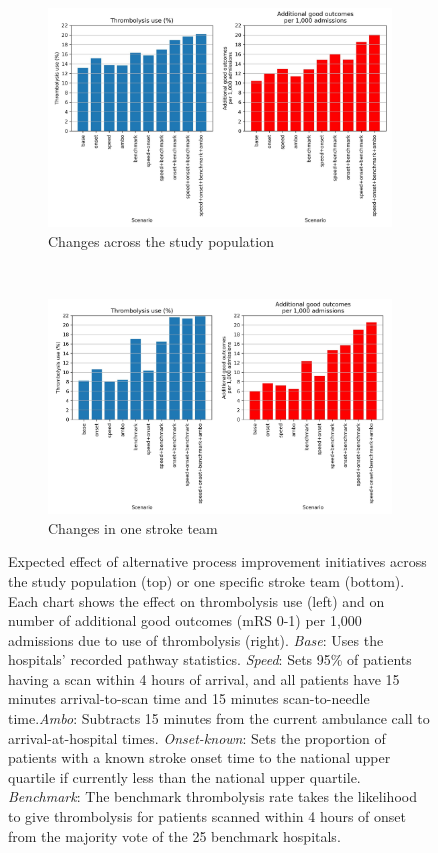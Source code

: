 \begin{figure}[!h]
    \centering
    \begin{subfigure}[b]{1\textwidth}
        \centering
        \includegraphics[width=0.8\linewidth]{images/sim_results_summary}
        \caption{Changes across the study population}
        \label{fig:scenarios_population}
    \end{subfigure}
    \\
    \vspace{8mm}
    \begin{subfigure}[b]{1\textwidth}
        \centering
    \includegraphics[width=0.8\linewidth]{images/sim_results_team_x}
        \caption{Changes in one stroke team}
        \label{fig:scenarios_team}
    \end{subfigure}
    \caption{Expected effect of alternative process improvement initiatives across the study population (top) or one specific stroke team (bottom). Each chart shows the effect on thrombolysis use (left) and on number of additional good outcomes (mRS 0-1) per 1,000 admissions due to use of thrombolysis (right). \textit{Base}: Uses the hospitals’ recorded pathway statistics. \textit{Speed}: Sets 95\% of patients having a scan within 4 hours of arrival, and all patients have 15 minutes arrival-to-scan time and 15 minutes scan-to-needle time.\textit{Ambo}: Subtracts 15 minutes from the current ambulance call to arrival-at-hospital times. \textit{Onset-known}: Sets the proportion of patients with a known stroke onset time to the national upper quartile if currently less than the national upper quartile. \textit{Benchmark}: The benchmark thrombolysis rate takes the likelihood to give thrombolysis for patients scanned within 4 hours of onset from the majority vote of the 25 benchmark hospitals.}
    \label{fig:sim_results_summary}
\end{figure}


